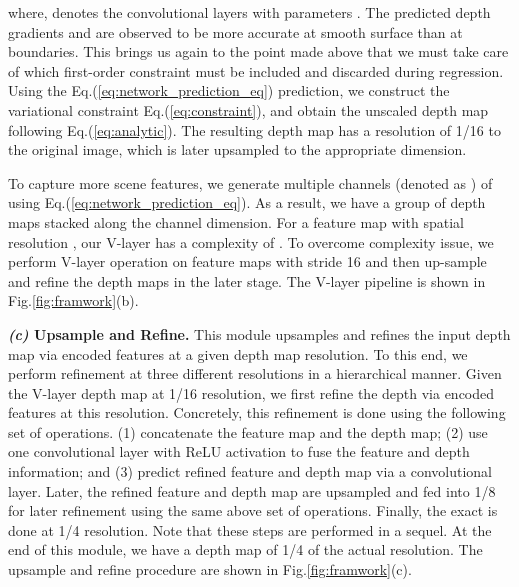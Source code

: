 \documentclass{article} \usepackage{iclr2023_conference, times}
\newcommand{\formattedparagraph}[1]{\noindent \textbf{#1}}
\begin{document}
where,  denotes the convolutional layers with parameters . The predicted depth gradients  and  are observed to be more accurate at smooth surface than at boundaries. This brings us again to the point made above that we must take care of which first-order constraint must be included and discarded during regression. Using the Eq.(\ref{eq:network_prediction_eq}) prediction, we construct the variational constraint Eq.(\ref{eq:constraint}), and obtain the unscaled depth map following Eq.(\ref{eq:analytic}). The resulting depth map has a resolution of 1/16 to the original image, which is later upsampled to the appropriate dimension. 

To capture more scene features, we generate multiple channels (denoted as ) of  using Eq.(\ref{eq:network_prediction_eq}). As a result, we have a group of depth maps stacked along the channel dimension. For a feature map with spatial resolution , our V-layer has a complexity of . To overcome complexity issue, we perform V-layer operation on feature maps with stride 16 and then up-sample and refine the depth maps in the later stage. The V-layer pipeline is shown in Fig.\ref{fig:framwork}(b).








\formattedparagraph{\textit{(c)} Upsample and Refine.} This module upsamples and refines the input depth map via encoded features at a given depth map resolution. To this end, we perform refinement at three different resolutions in a hierarchical manner. Given the V-layer depth map at 1/16 resolution, we first refine the depth via encoded features at this resolution. Concretely, this refinement is done using the following set of operations. (1) concatenate the feature map and the depth map; (2) use one convolutional layer with ReLU activation to fuse the feature and depth information; and (3) predict refined feature and depth map via a convolutional layer. Later, the refined feature and depth map are upsampled and fed into 1/8 for later refinement using the same above set of operations. Finally, the exact is done at 1/4 resolution. Note that these steps are performed in a sequel. At the end of this module, we have a depth map of 1/4 of the actual resolution. The upsample and refine procedure are shown in Fig.\ref{fig:framwork}(c).
\end{document}
